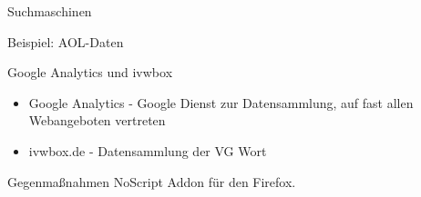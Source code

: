 \begin{frame}{Suchmaschinen}
\end{frame}

\begin{frame}{Beispiel: AOL-Daten}
\end{frame}

\begin{frame}{Google Analytics und ivwbox}
	\begin{itemize}
		\item Google Analytics - Google Dienst zur Datensammlung, auf fast allen Webangeboten vertreten
		\item ivwbox.de - Datensammlung der VG Wort
	\end{itemize}
	\begin{block}{Gegenma\ss nahmen}
		NoScript Addon f\"ur den Firefox.
	\end{block}
\end{frame}

